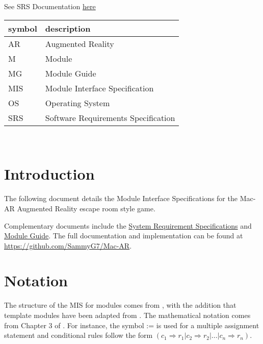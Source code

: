\documentclass[12pt, titlepage]{article}
\begin{document}
See SRS Documentation \href{https://github.com/SammyG7/Mac-AR/blob/main/docs/SRS/SRS.pdf} {here}\\


\renewcommand{\arraystretch}{1.2}
\begin{tabular}{l l} 
  \toprule		
  \textbf{symbol} & \textbf{description}\\
  \midrule 
  AR & Augmented Reality\\
  M & Module \\
  MG & Module Guide \\
  MIS & Module Interface Specification\\
  OS & Operating System \\
  SRS & Software Requirements Specification\\
  \bottomrule
\end{tabular}\\

\newpage

\tableofcontents

\newpage


\section{Introduction}

The following document details the Module Interface Specifications for the Mac-AR Augmented Reality escape room style game.

Complementary documents include the \href{https://github.com/SammyG7/Mac-AR/blob/main/docs/SRS/SRS.pdf}{System Requirement Specifications}
and \href{https://github.com/SammyG7/Mac-AR/blob/main/docs/Design/SoftArchitecture/MG.pdf}{Module Guide}.  The full documentation and implementation can be
found at \url{https://github.com/SammyG7/Mac-AR}. 

\section{Notation}

The structure of the MIS for modules comes from \citet{HoffmanAndStrooper1995},
with the addition that template modules have been adapted from
\cite{GhezziEtAl2003}.  The mathematical notation comes from Chapter 3 of
\citet{HoffmanAndStrooper1995}.  For instance, the symbol := is used for a
multiple assignment statement and conditional rules follow the form $(c_1
\Rightarrow r_1 | c_2 \Rightarrow r_2 | ... | c_n \Rightarrow r_n )$.
\end{document}
